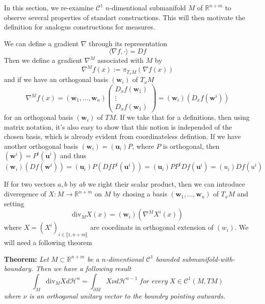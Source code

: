 In this section, we re-examine $\mathcal C^1$ $n$-dimentional submanifold $M$
of $\mathbb R^{n+m}$ to observe several properties of standart constructions.
This will then motivate the definition for analogus constructions for measures.

\vspace{2ex}
We can define a gradient $\nabla$ through its representation
\[\langle \nabla f, \cdot\rangle=Df\]
Then we define a gradient $\nabla^M$ associated with $M$ by
\[\nabla^M f(x) := \pi_{T_xM}(\nabla f(x))\]
and if we have an orthogonal basis $(\mathbf w_i)$ of $T_xM$
\[\nabla^M f(x) = (\mathbf w_1,\ldots,\mathbf w_n)\left(\begin{array}{c}D_xf(\mathbf w_1)\\ \vdots\\D_xf(\mathbf w_1)\end{array}\right)=(\mathbf w_i)(D_xf(\mathbf w^i))\]
for an orthogonal basis $(\mathbf w_i)$ of $TM$. If we take that for a definitions, then
using matrix notation, it's also easy to show that this notion is independed of the chosen basis,
which is already evident from coordinateless defintion. If we have another
orthogonal basis $(\mathbf w_i)=(\mathbf u_i)P$, where $P$ is orthogonal, 
then $(\mathbf w^i)=P^t(\mathbf u^i)$ and thus $(\mathbf w_i)(Df(\mathbf w^i))
=(\mathbf u_i)P(DfP^t(\mathbf u^i))=(\mathbf u_i)PP^tDf(\mathbf u^i)=(u_i)Df(u^i)$

\vspace{2ex}
If for two vectors $a,b$ by $ab$ we right their scalar product, then we can
introduce diveregence of $X:M\rightarrow\mathbb R^{n+m}$ on $M$ by chosing
a basis $(\mathbf w_1,\ldots,\mathbf w_n)$ of $T_xM$ and setting
\[\text{div}_MX(x)=(\mathbf w_i)(\nabla^MX^i(x))\]
where $X=(X^i)_{i\in\llbracket1,n+m\rrbracket}$ are coordinats in orthogonal
extension of $(w_i)$. We will need a following theorem

\vspace{2ex}
\textbf{Theorem:} \textit{Let $M\subset \mathbb R^{n+m}$ be a $n$-dimentional
$\mathcal C^1$ bounded submanifold-with-boundary. Then we have a following result}
\[\int_M \text{div}_MXd\mathcal H^n=\int_{\partial M}X\nu d\mathcal H^{n-1}\;\textit{for every}\;X\in\mathcal C^1(M,TM)\]
\textit{where $\nu$ is an orthogonal unitary vector to the boundry pointing outwards.}

